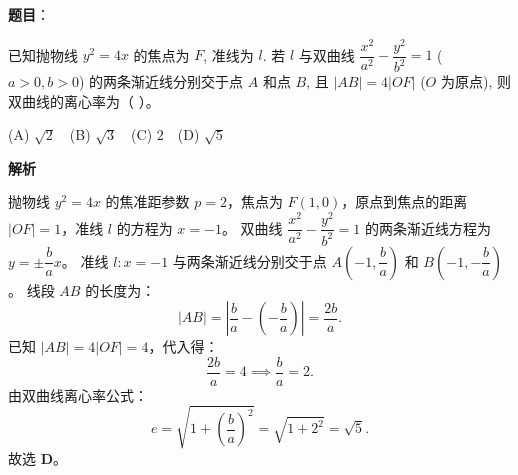 \begin{answer}

\textbf{题目}：

已知抛物线 $y^2 = 4x$ 的焦点为 $F$, 准线为 $l$. 若 $l$ 与双曲线 $\dfrac{x^2}{a^2} - \dfrac{y^2}{b^2} = 1$ ($a > 0, b > 0$) 的两条渐近线分别交于点 $A$ 和点 $B$, 且 $|AB| = 4|OF|$ ($O$ 为原点), 则双曲线的离心率为（ ）。

(A) $\sqrt{2}$　(B) $\sqrt{3}$　(C) $2$　(D) $\sqrt{5}$

\textbf{解析}

抛物线 $y^2 = 4x$ 的焦准距参数 $p = 2$，焦点为 $F(1, 0)$，原点到焦点的距离 $|OF| = 1$，准线 $l$ 的方程为 $x = -1$。
双曲线 $\dfrac{x^2}{a^2} - \dfrac{y^2}{b^2} = 1$ 的两条渐近线方程为 $y = \pm \dfrac{b}{a} x$。
准线 $l: x = -1$ 与两条渐近线分别交于点 $A\left(-1, \dfrac{b}{a}\right)$ 和 $B\left(-1, -\dfrac{b}{a}\right)$。
线段 $AB$ 的长度为：
\nopagebreak[4]
\[|AB| = \left|\frac{b}{a} - \left(-\frac{b}{a}\right)\right| = \frac{2b}{a}.\]
已知 $|AB| = 4|OF| = 4$，代入得：
\nopagebreak[4]
\[\frac{2b}{a} = 4 \implies \frac{b}{a} = 2.\]
由双曲线离心率公式：
\nopagebreak[4]
\[e = \sqrt{1 + \left(\frac{b}{a}\right)^2} = \sqrt{1 + 2^2} = \sqrt{5}.\]
故选 \textbf{D}。


\end{answer}

